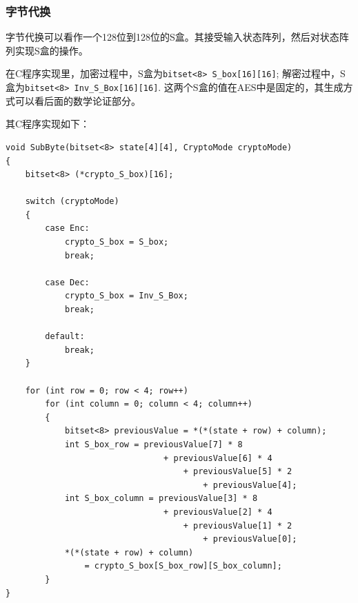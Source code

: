 \subsubsection{字节代换}
字节代换可以看作一个128位到128位的S盒。其接受输入状态阵列，然后对状态阵列实现S盒的操作。\par
在C程序实现里，加密过程中，S盒为\verb`bitset<8> S_box[16][16]`; 解密过程中，S盒为\verb`bitset<8> Inv_S_Box[16][16]`. 这两个S盒的值在AES中是固定的，其生成方式可以看后面的数学论证部分。\par
其C程序实现如下：
\begin{prove}
\begin{verbatim}
void SubByte(bitset<8> state[4][4], CryptoMode cryptoMode)
{
    bitset<8> (*crypto_S_box)[16];

    switch (cryptoMode)
    {
        case Enc:
            crypto_S_box = S_box;
            break;
            
        case Dec:
            crypto_S_box = Inv_S_Box;
            break;
            
        default:
            break;
    }
    
    for (int row = 0; row < 4; row++)
        for (int column = 0; column < 4; column++)
        {
            bitset<8> previousValue = *(*(state + row) + column);
            int S_box_row = previousValue[7] * 8
                                + previousValue[6] * 4
                                    + previousValue[5] * 2
                                        + previousValue[4];
            int S_box_column = previousValue[3] * 8
                                + previousValue[2] * 4
                                    + previousValue[1] * 2
                                        + previousValue[0];
            *(*(state + row) + column)
                = crypto_S_box[S_box_row][S_box_column];
        }
}
\end{verbatim}
\end{prove}
